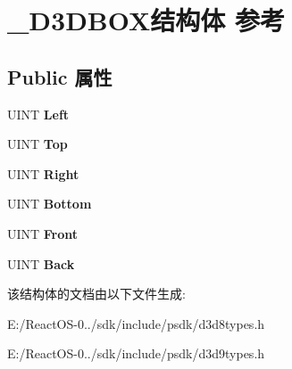 \hypertarget{struct___d3_d_b_o_x}{}\section{\+\_\+\+D3\+D\+B\+O\+X结构体 参考}
\label{struct___d3_d_b_o_x}
\subsection*{Public 属性}
\begin{DoxyCompactItemize}
\item 
\mbox{\label{struct___d3_d_b_o_x_a013afd9af59889096786ec240c3d92d5}} 
U\+I\+NT {\bfseries Left}
\item 
\mbox{\label{struct___d3_d_b_o_x_a5e67b4fa2d918599ce41e83cb8e89a84}} 
U\+I\+NT {\bfseries Top}
\item 
\mbox{\label{struct___d3_d_b_o_x_a62409d61f8523d9ebb9b8f1521eb3795}} 
U\+I\+NT {\bfseries Right}
\item 
\mbox{\label{struct___d3_d_b_o_x_a09fba710351b7514a3e16e87c7094ed7}} 
U\+I\+NT {\bfseries Bottom}
\item 
\mbox{\label{struct___d3_d_b_o_x_abcf9f6a83ce1d837768137ef253571c4}} 
U\+I\+NT {\bfseries Front}
\item 
\mbox{\label{struct___d3_d_b_o_x_af8abafe0f7d4857792abca9b28a8f231}} 
U\+I\+NT {\bfseries Back}
\end{DoxyCompactItemize}


该结构体的文档由以下文件生成\+:\begin{DoxyCompactItemize}
\item 
E\+:/\+React\+O\+S-\/0../sdk/include/psdk/d3d8types.\+h\item 
E\+:/\+React\+O\+S-\/0../sdk/include/psdk/d3d9types.\+h\end{DoxyCompactItemize}
